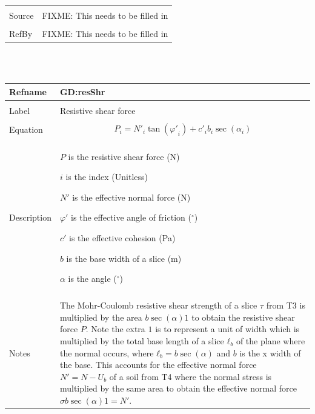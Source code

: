 \documentclass[12pt]{article}
\begin{document}
\begin{minipage}{\textwidth}
\begin{tabular}{p{} p{}}
\\ \midrule \\
Source & FIXME: This needs to be filled in
\\ \midrule \\
RefBy & FIXME: This needs to be filled in
\\ \bottomrule \end{tabular}
\end{minipage}\\
~\newline
\noindent \begin{minipage}{\textwidth}
\begin{tabular}{p{} p{}}
\toprule \textbf{Refname} & \textbf{GD:resShr}
\label{GD:resShr}
\\ \midrule \\
Label & Resistive shear force
\\ \midrule \\
Equation & \begin{dmath}
           P_{i}={N'}_{i} \tan\left({φ'}_{i}\right)+{c'}_{i} b_{i} \sec\left(α_{i}\right)
           \end{dmath}
\\ \midrule \\
Description & \begin{symbDescription}
              \item{$P$ is the resistive shear force (N)}
              \item{$i$ is the index (Unitless)}
              \item{$N'$ is the effective normal force (N)}
              \item{$φ'$ is the effective angle of friction (${}^{\circ}$)}
              \item{$c'$ is the effective cohesion (Pa)}
              \item{$b$ is the base width of a slice (m)}
              \item{$α$ is the angle (${}^{\circ}$)}
              \end{symbDescription}
\\ \midrule \\
Notes & The Mohr-Coulomb resistive shear strength of a slice $τ$ from T3 is multiplied by the area $b \sec\left(α\right) 1$ to obtain the resistive shear force $P$. Note the extra $1$ is to represent a unit of width which is multiplied by the total base length of a slice ${ℓ_{b}}$ of the plane where the normal occurs, where ${ℓ_{b}}=b \sec\left(α\right)$ and $b$ is the x width of the base. This accounts for the effective normal force $N'=N-{U_{b}}$ of a soil from T4 where the normal stress is multiplied by the same area to obtain the effective normal force $σ b \sec\left(α\right) 1=N'$.

\end{tabular}
\end{minipage}
\end{document}
